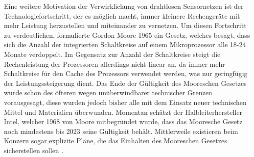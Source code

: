 Eine weitere Motivation der Verwirklichung von drahtlosen Sensornetzen ist der Technologiefortschritt, der es möglich macht, immer kleinere Rechengeräte mit mehr Leistung herzustellen und miteinander zu vernetzen. Um diesen Fortschritt zu verdeutlichen, formulierte Gordon Moore 1965 ein Gesetz, welches besagt, dass sich die Anzahl der integrierten Schaltkreise auf einem Mikroprozessor alle 18-24 Monate verdoppelt. Im Gegensatz zur Anzahl der Schaltkreise steigt die Rechenleistung der Prozessoren allerdings nicht linear an, da immer mehr Schaltkreise für den Cache des Prozessors verwendet werden, was nur geringfügig der Leistungssteigerung dient. Das Ende der Gültigkeit des Mooreschen Gesetzes wurde schon des öfteren wegen unüberwindbarer technischer Grenzen vorausgesagt, diese wurden jedoch bisher alle mit dem Einsatz neuer technischen Mittel und Materialien überwunden. Momentan schätzt der Halbleiterhersteller Intel, welcher 1968 von Moore mitbegründet wurde, dass das Mooresche Gesetz noch mindestens bis 2023 seine Gültigkeit behält. Mittlerweile existieren beim Konzern sogar explizite Pläne, die das Einhalten des Mooreschen Gesetzes sicherstellen sollen  \cite{d:wolf} \cite{ws:kahle} \cite{ws:tuomi}. \\
